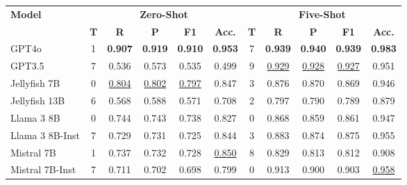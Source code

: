 \begin{tabular*}{\textwidth}{@{\extracolsep{\fill}}lcccccccccc}
    \toprule
    \multirow{2}{*}{\textbf{Model}} & \multicolumn{5}{c}{\textbf{Zero-Shot}} & \multicolumn{5}{c}{\textbf{Five-Shot}} \\
    \cmidrule(lr){2-6} \cmidrule(lr){7-11}
     & \textbf{T} & \textbf{R} & \textbf{P} & \textbf{F1} & \textbf{Acc.} & 
       \textbf{T} & \textbf{R} & \textbf{P} & \textbf{F1} & \textbf{Acc.} \\
    \midrule
    GPT4o & 1 & \textbf{0.907} & \textbf{0.919} & \textbf{0.910} & \textbf{0.953} & 7 &\textbf{0.939} & \textbf{0.940} & \textbf{0.939} & \textbf{0.983} \\
    GPT3.5 & 7 & 0.536 & 0.573 & 0.535 & 0.499 & 9 &\underline{0.929} & \underline{0.928} & \underline{0.927} & 0.951 \\
    Jellyfish 7B & 0 & \underline{0.804} & \underline{0.802} & \underline{0.797} & 0.847 & 3 & 0.876 & 0.870 & 0.869 & 0.946 \\ 
    Jellyfish 13B & 6 & 0.568 & 0.588 & 0.571 & 0.708 & 2 & 0.797 & 0.790 & 0.789 & 0.879 \\ 
    Llama 3 8B & 0 & 0.744 & 0.743 & 0.738 & 0.827 & 0 & 0.868 & 0.859 & 0.861 & 0.947 \\ 
    Llama 3 8B-Inst & 7 & 0.729 & 0.731 & 0.725 & 0.844 & 3 & 0.883 & 0.874 & 0.875 & 0.955 \\
    Mistral 7B & 1 & 0.737 & 0.732 & 0.728 & \underline{0.850} & 8 & 0.829 & 0.813 & 0.812 & 0.908 \\ 
    Mistral 7B-Inst & 7 & 0.711 & 0.702 & 0.698 & 0.799 & 0 & 0.913 & 0.900 & 0.903 & \underline{0.958} \\ 
    \bottomrule
\end{tabular*}